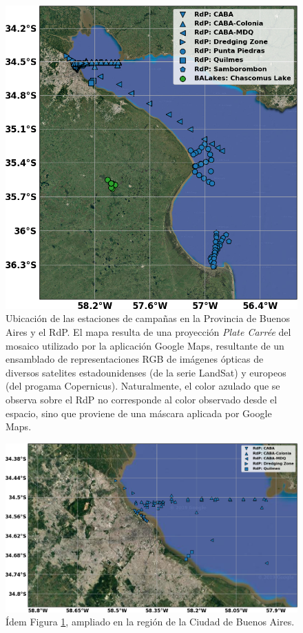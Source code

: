     \begin{figure}
    \centering
    \includegraphics[width=\textwidth]{dat/figures/MAP_BARdp.png}
    \caption[Ubicación de las estaciones de campañas en la Provincia de Buenos Aires y el RdP.]{Ubicación de las estaciones de campañas en la Provincia de Buenos Aires y el RdP. El mapa resulta de una proyección \textit{Plate Carrée} del mosaico utilizado por la aplicación Google Maps, resultante de un ensamblado de representaciones RGB de imágenes ópticas de diversos satelites estadounidenses (de la serie LandSat) y europeos (del progama Copernicus). Naturalmente, el color azulado que se observa sobre el RdP no corresponde al color observado desde el espacio, sino que proviene de una máscara aplicada por Google Maps.}
    \label{dat:bardp}
    \end{figure}
    
    \begin{figure}
    \centering
    \includegraphics[width=\textwidth]{dat/figures/MAP_CABA.png}
    \caption[Ubicación de las estaciones de campañas en la región de la Ciudad de Buenos Aires.]{Ídem Figura \ref{dat:bardp}, ampliado en la región de la Ciudad de Buenos Aires.}
    \label{dat:caba}
    \end{figure}
    
